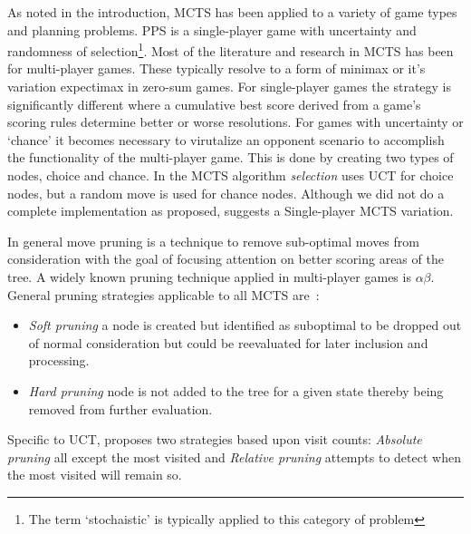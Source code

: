 \documentclass[letterpaper]{article}
\begin{document}
As noted in the introduction, MCTS has been applied to a variety of game types and planning problems. PPS is a single-player game with uncertainty and randomness of selection\footnote{The term `stochaistic' is typically applied to this category of problem}. Most of the literature and research in MCTS has been for multi-player games. These typically resolve to a form of minimax or it's variation expectimax in zero-sum games. For single-player games the strategy is significantly different where a cumulative best score derived from a game's scoring rules determine better or worse resolutions. For games with uncertainty or `chance' it becomes necessary to virutalize an opponent scenario to accomplish the functionality of the multi-player game. This is done by creating two types of nodes, choice and chance. In the MCTS algorithm \emph{selection} uses UCT for choice nodes, but a random move is used for chance nodes. Although we did not do a complete implementation as proposed, \cite{schadd2012single} suggests a Single-player MCTS variation.

In general move pruning is a technique to remove sub-optimal moves from consideration with the goal of focusing attention on better scoring areas of the tree. A widely known pruning technique applied in multi-player games is $\alpha\beta$. General pruning strategies applicable to all MCTS are~\cite{browne2010monte}:
\begin{itemize}
\item \emph{Soft pruning} a node is created but identified as suboptimal to be dropped out of normal consideration but could be reevaluated for later inclusion and processing.
\item \emph{Hard pruning} node is not added to the tree for a given state thereby being removed from further evaluation.
\end{itemize}
Specific to UCT, \cite{huang2010pruning} proposes two strategies based upon visit counts: \emph{Absolute pruning} all except the most visited and \emph{Relative pruning} attempts to detect when the most visited will remain so.

\end{document}
